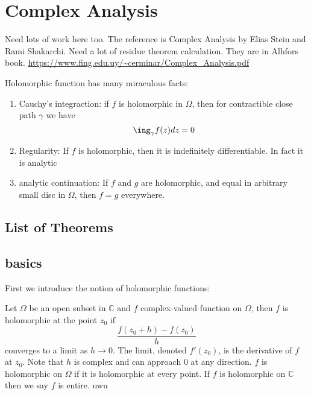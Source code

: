 \documentclass[main.tex]{subfiles}
\begin{document}
\section{Complex Analysis}
Need lots of work here too.
The reference is Complex Analysis by Elias Stein and Rami Shakarchi. Need a lot of residue theorem calculation. They are in Alhfors book. \url{https://www.fing.edu.uy/~cerminar/Complex_Analysis.pdf}

Holomorphic function has many miraculous facts:
\begin{enumerate}
    \item Cauchy's integraction: if $f$ is holomorphic in $\Omega$, then for contractible close path $\gamma$ we have 
    $$
    \ing_\gamma f(z) dz = 0
    $$
    \item Regularity: If $f$ is holomorphic, then it is indefinitely differentiable. In fact it is analytic
    \item analytic continuation: If $f$ and $g$ are holomorphic, and equal in arbitrary small disc in $\Omega$, then $f = g$ everywhere.
\end{enumerate}

\subsection{List of Theorems}

\subsection{basics}

First we introduce the notion of holomorphic functions:

\begin{definition}
Let $\Omega$ be an open subset in $\mathbb{C}$ and $f$ complex-valued function on $\Omega$, then $f$ is holomorphic at the point $z_0$ if 
$$
\frac{f(z_0 + h) - f(z_0)}{h}
$$
converges to a limit as $h \rightarrow 0$. The limit, denoted $f'(z_0)$, is the derivative of $f$ at $z_0$. Note that $h$ is complex and can approach $0$ at any direction. $f$ is holomorphic on $\Omega$ if it is holomorphic at every point. If $f$ is holomorphic on $\mathbb{C}$ then we say $f$ is entire. uwu
\end{definition}
\end{document}
